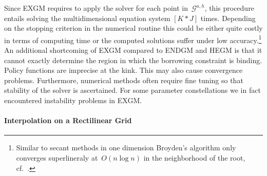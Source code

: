\documentclass[a4paper,12pt]{article}
\begin{document}
Since EXGM requires to apply the solver for each point in~$\mathcal{G}^{a,h}$, this procedure entails solving the multidimensional equation system $\left[ K \ast J\right]$ times. Depending on the stopping criterion in the numerical routine this could be either quite costly in terms of computing time or the computed solutions suffer under low accuracy.\footnote{Similar to secant methods in one dimension Broyden's algorithm only converges superlineraly at~$O(n\log n)$ in the neighborhood of the root, cf.~.}
An additional shortcoming of EXGM compared to ENDGM and HEGM is that it cannot exactly determine the region in which the borrowing constraint is binding. Policy functions are imprecise at the kink. This may also cause convergence problems. Furthermore, numerical methods often require fine tuning so that stability of the solver is ascertained. For some parameter constellations we in fact encountered instability problems in EXGM.

\paragraph{Interpolation on a Rectilinear Grid}
\end{document}
